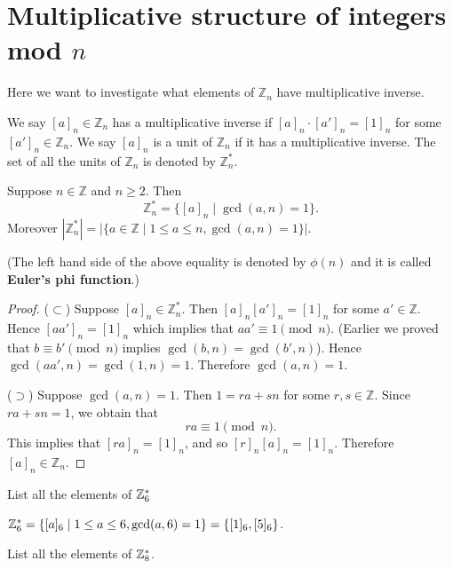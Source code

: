 \section{Multiplicative structure of integers mod $n$}
Here we want to investigate what elements of $\mathbb{Z}_n$
have multiplicative inverse.
\begin{definition}
    We say $[a]_n\in\mathbb{Z}_n$ has a multiplicative inverse
    if $[a]_n\cdot [a']_n=[1]_n$ for some $[a']_n\in\mathbb{Z}_n$. We say $[a]_n$
    is a unit of $\mathbb{Z}_n$ if it has a multiplicative 
    inverse. The set of all the units of $\mathbb{Z}_n$ is denoted
    by $\mathbb{Z}_n^*$.
\end{definition}

\begin{theorem}
    Suppose $n\in\mathbb{Z}$ and $n\geq 2$. Then
    \[\mathbb{Z}_n^*=\{[a]_n\mid \gcd(a,n)=1\}.\]
    Moreover $|\mathbb{Z}_n^*|=|\{a\in\mathbb{Z}\mid 1\leq a\leq n,\gcd(a,n)=1\}|$.
\end{theorem}

(The left hand side of the above equality is denoted
by $\phi(n)$ and it is called \textbf{Euler's phi function}.)

\begin{proof}
    ($\subset$) Suppose $[a]_n\in\mathbb{Z}_n^*$. Then $[a]_n[a']_n=[1]_n$
    for some $a'\in\mathbb{Z}$. Hence $[aa']_n=[1]_n$ which implies
    that $aa'\equiv 1\pmod n$. (Earlier we proved that $b\equiv b'\pmod n$
    implies $\gcd(b,n)=\gcd(b',n)$). Hence $\gcd(aa',n)=\gcd(1,n)=1$.
    Therefore $\gcd(a,n)=1$.

    ($\supset$) Suppose $\gcd(a,n)=1$. Then $1=ra+sn$
    for some $r,s\in\mathbb{Z}$. Since $ra+sn=1$, we obtain that
    \[ra\equiv 1\pmod n.\]
    This implies that $[ra]_n=[1]_n$, and so 
    $[r]_n[a]_n=[1]_n$. Therefore $[a]_n\in\mathbb{Z}_n$.
\end{proof}

\begin{example}
    List all the elements of $\mathbb{Z}_6^*$
\end{example}

\begin{solve}
    $\mathbb{Z}_6^*=\{[a]_6\mid 1\leq a\leq 6,\gcd(a,6)=1\}=\{[1]_6,[5]_6\}$.
\end{solve}

\begin{example}
    List all the elements of $\mathbb{Z}_8^*$.
\end{example}

